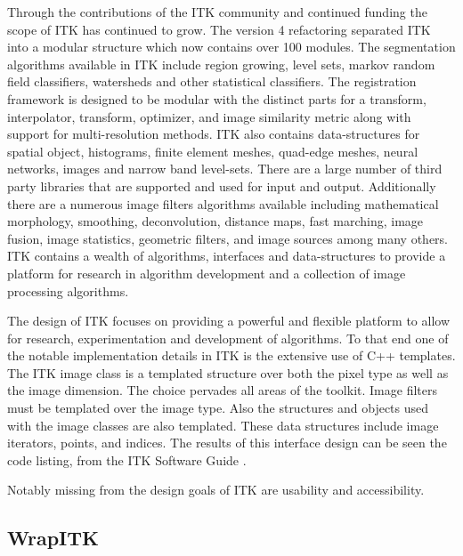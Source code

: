 \documentclass{frontiersMED} %
\begin{document}
Through the contributions of the ITK community and continued funding
the scope of ITK has continued to grow. The version 4 refactoring
separated ITK into a modular structure which now contains over 100
modules. The segmentation algorithms available in ITK include region
growing, level sets, markov random field classifiers, watersheds and
other statistical classifiers. The registration framework is designed
to be modular with the distinct parts for a transform, interpolator,
transform, optimizer, and image similarity metric along with support
for multi-resolution methods. ITK also contains data-structures for
spatial object, histograms, finite element meshes, quad-edge meshes,
neural networks, images and narrow band level-sets. There are a large
number of third party libraries that are supported and used for input
and output. Additionally there are a numerous image filters algorithms
available including mathematical morphology, smoothing, deconvolution,
distance maps, fast marching, image fusion, image statistics,
geometric filters, and image sources among many others. ITK contains a
wealth of algorithms, interfaces and data-structures to provide a
platform for research in algorithm development and a collection of
image processing algorithms.

The design of ITK focuses on providing a powerful and flexible
platform to allow for research, experimentation and development of
algorithms. To that end one of the notable implementation details in
ITK is the extensive use of C++ templates. The ITK image class is a
templated structure over both the pixel type as well as the image
dimension. The choice pervades all areas of the toolkit. Image filters
must be templated over the image type. Also the structures and objects
used with the image classes are also templated. These data structures
include image iterators, points, and indices. The results of this
interface design can be seen the code listing, from the ITK Software
Guide \cite{Ibanez2005}.



Notably missing from the design goals of ITK are usability and accessibility.


\subsection{WrapITK}
\end{document}
